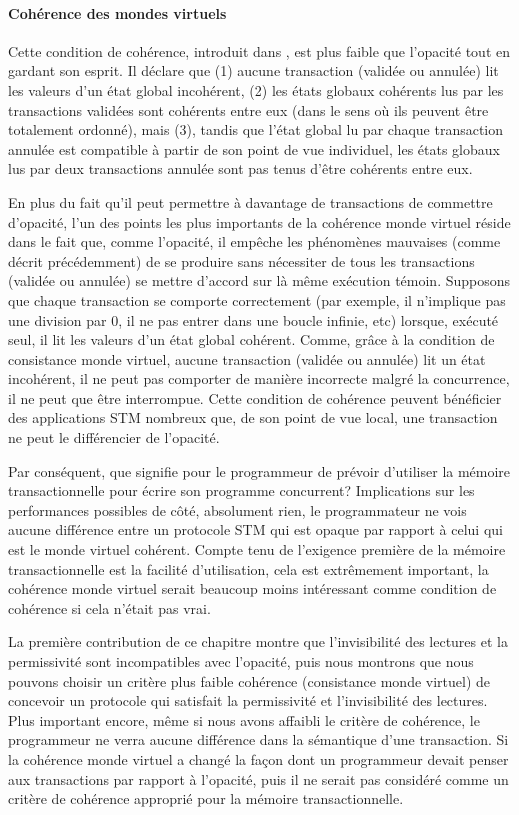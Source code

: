 \paragraph{Cohérence des mondes virtuels}
Cette condition de cohérence, introduit dans \cite{IR09}, est plus faible que l'opacité tout en gardant son esprit.
Il déclare que (1) aucune transaction (validée ou annulée) lit les valeurs d'un état global incohérent,
(2) les états globaux cohérents lus par les transactions validées sont cohérents entre eux (dans le sens où ils peuvent être totalement ordonné),
mais (3), tandis que l'état global lu par chaque transaction annulée est compatible à partir de son point de vue individuel,
les états globaux lus par deux transactions annulée sont pas tenus d'être cohérents entre eux.

En plus du fait qu'il peut permettre à davantage de transactions de commettre d'opacité,
l'un des points les plus importants de la cohérence monde virtuel réside dans le fait que, comme l'opacité,
il empêche les phénomènes mauvaises (comme décrit précédemment) de se produire sans nécessiter de tous les transactions
(validée ou annulée) se mettre d'accord sur là même exécution témoin.
Supposons que chaque transaction se comporte correctement (par exemple, il n'implique pas une division par 0,
il ne pas entrer dans une boucle infinie, etc) lorsque, exécuté seul, il lit les valeurs d'un état global cohérent.
Comme, grâce à la condition de consistance monde virtuel, aucune transaction (validée ou annulée) lit un état incohérent,
il ne peut pas comporter de manière incorrecte malgré la concurrence, il ne peut que être interrompue.
Cette condition de cohérence peuvent bénéficier des applications STM nombreux que, de son point de vue local,
une transaction ne peut le différencier de l'opacité.




Par conséquent, que signifie pour le programmeur de prévoir d'utiliser la mémoire transactionnelle pour écrire son programme concurrent?
Implications sur les performances possibles de côté, absolument rien, le programmateur
ne vois aucune différence entre un protocole STM qui est opaque par rapport à celui qui est le monde virtuel cohérent.
Compte tenu de l'exigence première de la mémoire transactionnelle est la facilité d'utilisation, cela est extrêmement important,
la cohérence monde virtuel serait beaucoup moins intéressant comme condition de cohérence si cela n'était pas vrai.

La première contribution de ce chapitre montre que l'invisibilité des lectures et la permissivité sont incompatibles avec l'opacité,
puis nous montrons que nous pouvons choisir un critère plus faible cohérence (consistance monde virtuel) de concevoir un protocole qui satisfait la permissivité et l'invisibilité des lectures.
Plus important encore, même si nous avons affaibli le critère de cohérence, le programmeur ne verra aucune différence dans la sémantique d'une transaction.
Si la cohérence monde virtuel a changé la façon dont un programmeur devait penser aux transactions par rapport à l'opacité,
puis il ne serait pas considéré comme un critère de cohérence approprié pour la mémoire transactionnelle.


